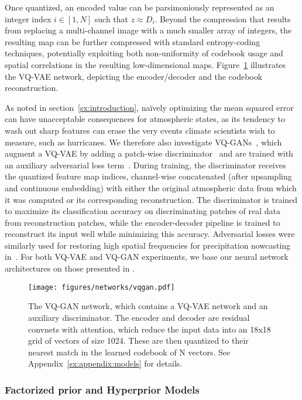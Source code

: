 \documentclass[11pt, a4paper, logo, copyright, numbering]{googledeepmind}
\begin{document}
Once quantized, an encoded value can be parsimoniously represented as an integer index $i \in [1, N]$ such that $z \approx D_i$.
Beyond the compression that results from replacing a multi-channel image with a much smaller array of integers, the resulting map can be further compressed with standard entropy-coding techniques, potentially exploiting both non-uniformity of codebook usage and spatial correlations in the resulting low-dimensional maps. Figure~\ref{fig:vqvae} illustrates the VQ-VAE network, depicting the encoder/decoder and the codebook reconstruction.

As noted in section~\ref{sx:introduction}, na\"ively optimizing the mean squared error can have unacceptable consequences for atmospheric states, as its tendency to wash out sharp features can erase the very events climate scientists wish to measure, such as hurricanes.
We therefore also investigate VQ-GANs~\citep{esser2021taming}, which augment a VQ-VAE by adding a patch-wise discriminator~\citep{isola2017image} and are trained with an auxiliary adversarial loss term~\citep{goodfellow2014gan}. During training, the discriminator receives the quantized feature map indices, channel-wise concatenated (after upsampling and continuous embedding) with either the original atmospheric data from which it was computed or its corresponding reconstruction. The discriminator is trained to maximize its classification accuracy on discriminating patches of real data from reconstruction patches, while the encoder-decoder pipeline is trained to reconstruct its input well while minimizing this accuracy.
Adversarial losses were similarly used for restoring high spatial frequencies for precipitation nowcasting in~\cite{ravuri2021nowcasting}.
For both VQ-VAE and VQ-GAN experiments, we base our neural network architectures on those presented in \cite{esser2021taming}.

\begin{figure}
    \centering
    \texttt{[image: figures/networks/vqgan.pdf]}
    \caption{The VQ-GAN network, which contains a VQ-VAE network and an auxiliary discriminator. The encoder and decoder are residual convnets with attention, which reduce the input data into an 18x18 grid of vectors of size 1024. These are then quantized to their nearest match in the learned codebook of N vectors. See Appendix~\ref{sx:appendix:models} for details.}
    \label{fig:vqvae}
\end{figure}

\subsubsection{Factorized prior and Hyperprior Models}
\end{document}
